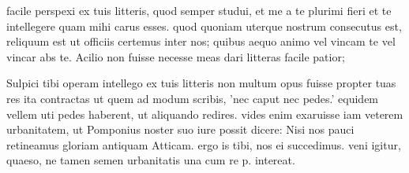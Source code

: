 


 facile perspexi ex tuis litteris, quod semper studui, et me a te plurimi fieri et te intellegere quam mihi carus esses. quod quoniam uterque nostrum consecutus est, reliquum est ut officiis certemus inter nos; quibus aequo animo vel vincam te vel vincar abs te. Acilio non fuisse necesse meas dari litteras facile patior;

 Sulpici tibi operam intellego ex tuis litteris non multum opus fuisse propter tuas res ita contractas ut quem ad modum scribis, 'nec caput nec pedes.' equidem vellem uti pedes haberent, ut aliquando redires. vides enim exaruisse iam veterem urbanitatem, ut Pomponius noster suo iure possit dicere: Nisi nos pauci retineamus gloriam antiquam Atticam. ergo is tibi, nos ei succedimus. veni igitur, quaeso, ne tamen semen urbanitatis una cum re p. intereat.
